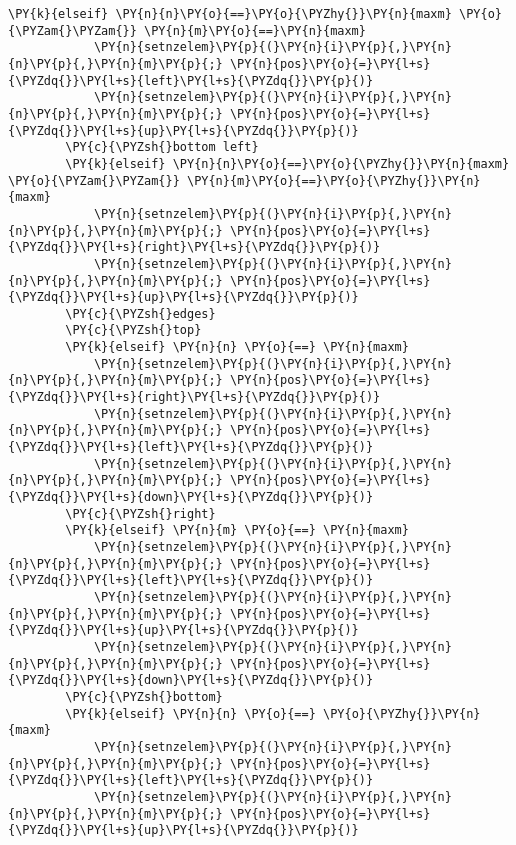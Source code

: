 \begin{Verbatim}[commandchars=\\\{\}]
        \PY{k}{elseif} \PY{n}{n}\PY{o}{==}\PY{o}{\PYZhy{}}\PY{n}{maxm} \PY{o}{\PYZam{}\PYZam{}} \PY{n}{m}\PY{o}{==}\PY{n}{maxm}
            \PY{n}{setnzelem}\PY{p}{(}\PY{n}{i}\PY{p}{,}\PY{n}{n}\PY{p}{,}\PY{n}{m}\PY{p}{;} \PY{n}{pos}\PY{o}{=}\PY{l+s}{\PYZdq{}}\PY{l+s}{left}\PY{l+s}{\PYZdq{}}\PY{p}{)}
            \PY{n}{setnzelem}\PY{p}{(}\PY{n}{i}\PY{p}{,}\PY{n}{n}\PY{p}{,}\PY{n}{m}\PY{p}{;} \PY{n}{pos}\PY{o}{=}\PY{l+s}{\PYZdq{}}\PY{l+s}{up}\PY{l+s}{\PYZdq{}}\PY{p}{)}
        \PY{c}{\PYZsh{}bottom left}
        \PY{k}{elseif} \PY{n}{n}\PY{o}{==}\PY{o}{\PYZhy{}}\PY{n}{maxm} \PY{o}{\PYZam{}\PYZam{}} \PY{n}{m}\PY{o}{==}\PY{o}{\PYZhy{}}\PY{n}{maxm}
            \PY{n}{setnzelem}\PY{p}{(}\PY{n}{i}\PY{p}{,}\PY{n}{n}\PY{p}{,}\PY{n}{m}\PY{p}{;} \PY{n}{pos}\PY{o}{=}\PY{l+s}{\PYZdq{}}\PY{l+s}{right}\PY{l+s}{\PYZdq{}}\PY{p}{)}
            \PY{n}{setnzelem}\PY{p}{(}\PY{n}{i}\PY{p}{,}\PY{n}{n}\PY{p}{,}\PY{n}{m}\PY{p}{;} \PY{n}{pos}\PY{o}{=}\PY{l+s}{\PYZdq{}}\PY{l+s}{up}\PY{l+s}{\PYZdq{}}\PY{p}{)}
        \PY{c}{\PYZsh{}edges}
        \PY{c}{\PYZsh{}top}
        \PY{k}{elseif} \PY{n}{n} \PY{o}{==} \PY{n}{maxm}
            \PY{n}{setnzelem}\PY{p}{(}\PY{n}{i}\PY{p}{,}\PY{n}{n}\PY{p}{,}\PY{n}{m}\PY{p}{;} \PY{n}{pos}\PY{o}{=}\PY{l+s}{\PYZdq{}}\PY{l+s}{right}\PY{l+s}{\PYZdq{}}\PY{p}{)}
            \PY{n}{setnzelem}\PY{p}{(}\PY{n}{i}\PY{p}{,}\PY{n}{n}\PY{p}{,}\PY{n}{m}\PY{p}{;} \PY{n}{pos}\PY{o}{=}\PY{l+s}{\PYZdq{}}\PY{l+s}{left}\PY{l+s}{\PYZdq{}}\PY{p}{)}
            \PY{n}{setnzelem}\PY{p}{(}\PY{n}{i}\PY{p}{,}\PY{n}{n}\PY{p}{,}\PY{n}{m}\PY{p}{;} \PY{n}{pos}\PY{o}{=}\PY{l+s}{\PYZdq{}}\PY{l+s}{down}\PY{l+s}{\PYZdq{}}\PY{p}{)}
        \PY{c}{\PYZsh{}right}
        \PY{k}{elseif} \PY{n}{m} \PY{o}{==} \PY{n}{maxm}
            \PY{n}{setnzelem}\PY{p}{(}\PY{n}{i}\PY{p}{,}\PY{n}{n}\PY{p}{,}\PY{n}{m}\PY{p}{;} \PY{n}{pos}\PY{o}{=}\PY{l+s}{\PYZdq{}}\PY{l+s}{left}\PY{l+s}{\PYZdq{}}\PY{p}{)}
            \PY{n}{setnzelem}\PY{p}{(}\PY{n}{i}\PY{p}{,}\PY{n}{n}\PY{p}{,}\PY{n}{m}\PY{p}{;} \PY{n}{pos}\PY{o}{=}\PY{l+s}{\PYZdq{}}\PY{l+s}{up}\PY{l+s}{\PYZdq{}}\PY{p}{)}
            \PY{n}{setnzelem}\PY{p}{(}\PY{n}{i}\PY{p}{,}\PY{n}{n}\PY{p}{,}\PY{n}{m}\PY{p}{;} \PY{n}{pos}\PY{o}{=}\PY{l+s}{\PYZdq{}}\PY{l+s}{down}\PY{l+s}{\PYZdq{}}\PY{p}{)}
        \PY{c}{\PYZsh{}bottom}
        \PY{k}{elseif} \PY{n}{n} \PY{o}{==} \PY{o}{\PYZhy{}}\PY{n}{maxm}
            \PY{n}{setnzelem}\PY{p}{(}\PY{n}{i}\PY{p}{,}\PY{n}{n}\PY{p}{,}\PY{n}{m}\PY{p}{;} \PY{n}{pos}\PY{o}{=}\PY{l+s}{\PYZdq{}}\PY{l+s}{left}\PY{l+s}{\PYZdq{}}\PY{p}{)}
            \PY{n}{setnzelem}\PY{p}{(}\PY{n}{i}\PY{p}{,}\PY{n}{n}\PY{p}{,}\PY{n}{m}\PY{p}{;} \PY{n}{pos}\PY{o}{=}\PY{l+s}{\PYZdq{}}\PY{l+s}{up}\PY{l+s}{\PYZdq{}}\PY{p}{)}

\end{Verbatim}
